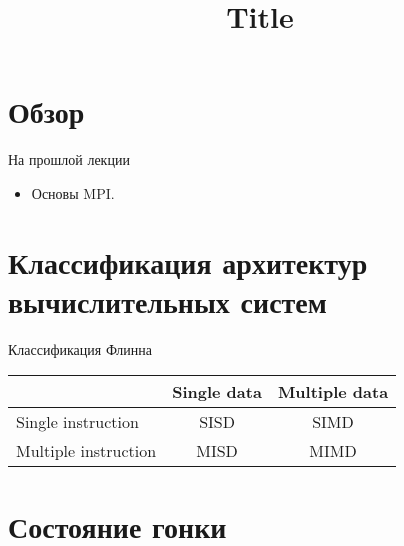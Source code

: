 

\title{Title}



\begin{frame}
\titlepage
\end{frame}

\section{Обзор}

\begin{frame}
\tableofcontents
\end{frame} 

\begin{frame}{На прошлой лекции}

\begin{itemize}
	\item Основы MPI.
\end{itemize}

\end{frame}

\section{Классификация архитектур вычислительных систем}

\begin{frame}{Классификация Флинна}

\begin{table}[htp]
	\begin{center}
	\begin{tabular}{|l|c|c|}
		\hline
		& Single data & Multiple data \\
		\hline
		Single instruction & SISD & SIMD \\
		\hline
		Multiple instruction & MISD & MIMD \\
		\hline
	\end{tabular}
	\end{center}
\end{table}

\end{frame}

\section{Состояние гонки}

\begin{frame}
\todo
\end{frame}

